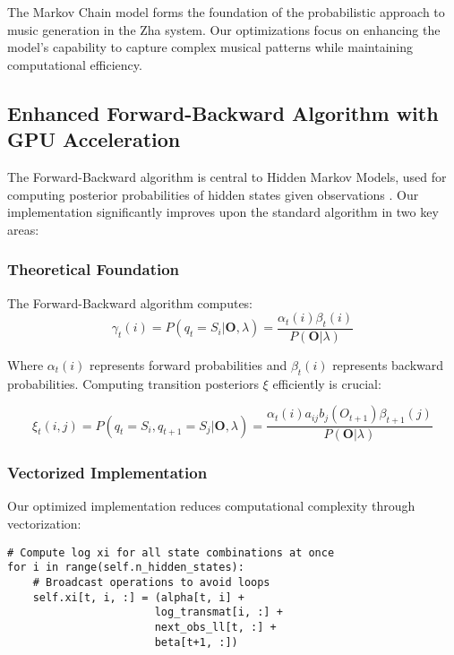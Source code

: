 \documentclass[12pt,a4paper]{article}
\begin{document}
The Markov Chain model forms the foundation of the probabilistic approach to music generation in the Zha system. Our optimizations focus on enhancing the model's capability to capture complex musical patterns while maintaining computational efficiency.

\subsection{Enhanced Forward-Backward Algorithm with GPU Acceleration}

The Forward-Backward algorithm is central to Hidden Markov Models, used for computing posterior probabilities of hidden states given observations \cite{rabiner1989tutorial}. Our implementation significantly improves upon the standard algorithm in two key areas:

\subsubsection{Theoretical Foundation}

The Forward-Backward algorithm computes:
\begin{equation}
\gamma_t(i) = P(q_t = S_i | \mathbf{O}, \lambda) = \frac{\alpha_t(i)\beta_t(i)}{P(\mathbf{O}|\lambda)}
\end{equation}

Where $\alpha_t(i)$ represents forward probabilities and $\beta_t(i)$ represents backward probabilities. Computing transition posteriors $\xi$ efficiently is crucial:

\begin{equation}
\xi_t(i,j) = P(q_t = S_i, q_{t+1} = S_j | \mathbf{O}, \lambda) = \frac{\alpha_t(i) a_{ij} b_j(O_{t+1}) \beta_{t+1}(j)}{P(\mathbf{O}|\lambda)}
\end{equation}

\subsubsection{Vectorized Implementation}

Our optimized implementation reduces computational complexity through vectorization:

\begin{verbatim}
# Compute log xi for all state combinations at once
for i in range(self.n_hidden_states):
    # Broadcast operations to avoid loops
    self.xi[t, i, :] = (alpha[t, i] + 
                       log_transmat[i, :] + 
                       next_obs_ll[t, :] + 
                       beta[t+1, :])
\end{verbatim}
\end{document}
